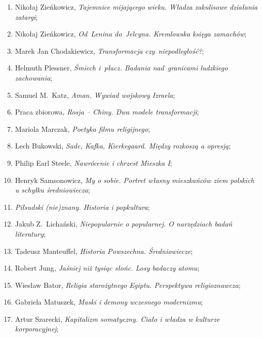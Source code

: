 \documentclass[a4paper,11pt]{article}
\begin{document}
\begin{enumerate}
\item Nikołaj Zieńkowicz, \textit{Tajemnice mijającego wieku. Władza
    zakulisowe działania zatargi};

\item Nikołaj Zieńkowicz, \textit{Od~Lenina do~Jelcyna. Kremlowska
    księga zamachów};

\item Marek Jan Chodakiewicz, \textit{Transformacja czy~niepodległość?};

\item Helmuth Plessner, \textit{Śmiech i~płacz. Badania nad~granicami
    ludzkiego zachowania};

\item Samuel M.~Katz, \textit{Aman. Wywiad wojskowy Izraela};

\item Praca zbiorowa, \textit{Rosja -- Chiny. Dwa modele transformacji};

\item Mariola Marczak, \textit{Poetyka filmu religijnego};

\item Lech Bukowski, \textit{Sade, Kafka, Kierkegaard. Między rozkoszą a
    opresją};

\item Philip Earl Steele, \textit{Nawrócenie i chrzest Mieszka I};

\item Henryk Samsonowicz, \textit{My o sobie. Portret własny mieszkańców
    ziem polskich u schyłku średniowiecza};

\item \textit{Piłsudski (nie)znany. Historia i popkultura};

\item Jakub Z.~Lichański, \textit{Niepopularnie o popularnej. O
    narzędziach badań literatury};

\item Tadeusz Manteuffel, \textit{Historia Powszechna. Średniowiecze};

\item Robert Jung, \textit{Jaśniej niż tysiąc słońc. Losy badaczy
    atomu};

\item Wiesław Bator, \textit{Religia starożytnego Egiptu. Perspektywa
    religioznawcza};

\item Gabriela Matuszek, \textit{Maski i demony wczesnego modernizmu};

\item Artur Szarecki, \textit{Kapitalizm somatyczny. Ciało i władza w
    kulturze korporacyjnej};


\end{enumerate}
\end{document}
